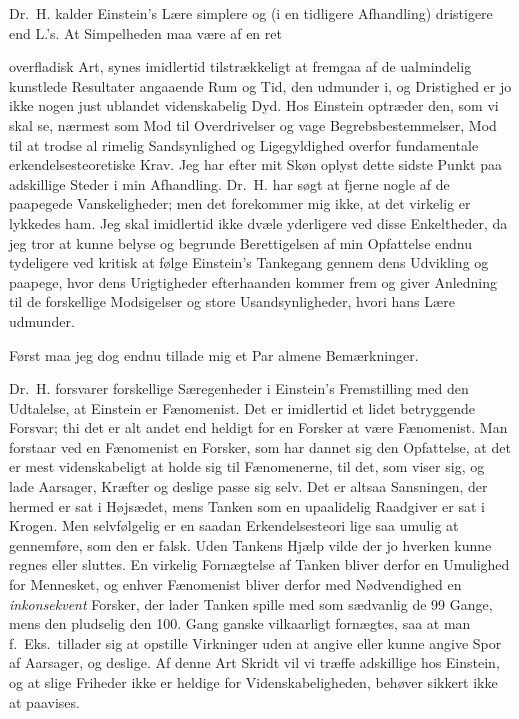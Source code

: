\documentclass[12pt,a4paper]{article}
\newcommand{\opage}[1]{\marginnote{\footnotesize\textit{[#1]}}}
\begin{document}
Dr.\ H. kalder Einstein's Lære simplere og (i en tidligere Afhandling)
dristigere end L.'s. At Simpelheden maa være af en ret

\opage{194} overfladisk Art, synes imidlertid tilstrækkeligt at fremgaa af de ualmindelig
kunstlede Resultater angaaende Rum og Tid, den udmunder i, og Dristighed er jo
ikke nogen just ublandet videnskabelig Dyd. Hos Einstein optræder den, som vi
skal se, nærmest som Mod til Overdrivelser og vage Begrebsbestemmelser, Mod til
at trodse al rimelig Sandsynlighed og Ligegyldighed overfor fundamentale
erkendelsesteoretiske Krav. Jeg har efter mit Skøn oplyst dette sidste Punkt
paa adskillige Steder i min Afhandling. Dr.\ H. har søgt at fjerne nogle af de
paapegede Vanskeligheder; men det forekommer mig ikke, at det virkelig er
lykkedes ham. Jeg skal imidlertid ikke dvæle yderligere ved disse Enkeltheder,
da jeg tror at kunne belyse og begrunde Berettigelsen af min Opfattelse endnu
tydeligere ved kritisk at følge Einstein's Tankegang gennem dens Udvikling og
paapege, hvor dens Urigtigheder efterhaanden kommer frem og giver Anledning til
de forskellige Modsigelser og store Usandsynligheder, hvori hans Lære udmunder.

Først maa jeg dog endnu tillade mig et Par almene Bemærkninger.

Dr.\ H. forsvarer forskellige Særegenheder i Einstein's Fremstilling med den
Udtalelse, at Einstein er Fænomenist. Det er imidlertid et lidet betryggende
Forsvar; thi det er alt andet end heldigt for en Forsker at være Fænomenist.
Man forstaar ved en Fænomenist en Forsker, som har dannet sig den Opfattelse,
at det er mest videnskabeligt at holde sig til Fænomenerne, til det,
\guillemotleft som viser sig\guillemotright, og lade Aarsager, Kræfter og
deslige passe sig selv. Det er altsaa Sansningen, der hermed er sat i
Højsædet, mens Tanken som en upaalidelig Raadgiver er sat i Krogen. Men
selvfølgelig er en saadan Erkendelsesteori lige saa umulig at gennemføre, som
den er falsk. Uden Tankens Hjælp vilde der jo hverken kunne regnes eller
sluttes. En virkelig Fornægtelse af Tanken bliver derfor en Umulighed for
Mennesket, og enhver Fænomenist bliver derfor med Nødvendighed en
\emph{inkonsekvent} Forsker, der lader Tanken spille med som sædvanlig de 99
Gange, mens den pludselig den 100. Gang ganske vilkaarligt fornægtes, saa at
man f.\ Eks.\ tillader sig at opstille Virkninger uden at angive eller kunne
angive Spor af Aarsager, og deslige. Af denne Art Skridt vil vi træffe
adskillige hos Einstein, og at slige Friheder ikke er heldige for
Videnskabeligheden, behøver sikkert ikke at paavises.
\end{document}
